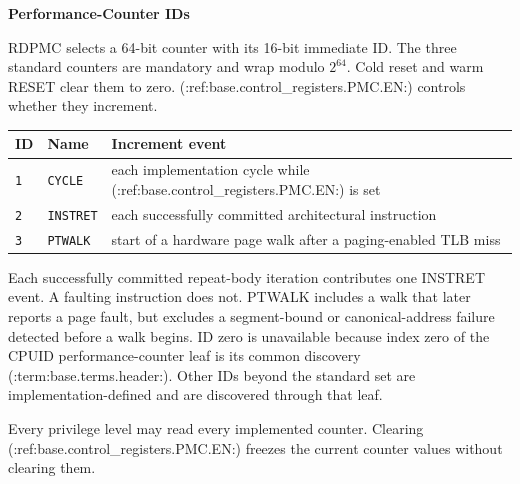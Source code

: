 \textbf{Performance-Counter IDs}\par
RDPMC selects a 64-bit counter with its 16-bit immediate ID. The three standard counters are mandatory and wrap
modulo $2^{64}$. Cold reset and warm RESET clear them to zero. (:ref:base.control_registers.PMC.EN:) controls whether they increment.

\Needspace{1.25in}
\begingroup\footnotesize
\setlength{\aboverulesep}{0pt}
\setlength{\belowrulesep}{0pt}
\setlength{\extrarowheight}{1.2pt}
\begin{center}
\begin{tabularx}{\linewidth}{@{}>{\raggedright\arraybackslash}p{0.55in}>{\raggedright\arraybackslash}p{1.05in}>{\raggedright\arraybackslash}X@{}}
\toprule
\rowcolor{BedrockHeaderFill}
\textbf{ID} & \textbf{Name} & \textbf{Increment event}\\
\midrule
\texttt{1} & \texttt{CYCLE} & each implementation cycle while (:ref:base.control_registers.PMC.EN:) is set\\
\texttt{2} & \texttt{INSTRET} & each successfully committed architectural instruction\\
\texttt{3} & \texttt{PTWALK} & start of a hardware page walk after a paging-enabled TLB miss\\
\bottomrule
\end{tabularx}
\end{center}
\endgroup

Each successfully committed repeat-body iteration contributes one INSTRET event. A faulting instruction does not.
PTWALK includes a walk that later reports a page fault, but excludes a segment-bound or canonical-address failure
detected before a walk begins. ID zero is unavailable because index zero of the CPUID performance-counter leaf is its
common discovery (:term:base.terms.header:). Other IDs beyond the standard set are implementation-defined and are discovered through that
leaf.

\begin{BedrockRaggedBlock}
Every privilege level may read every implemented counter. Clearing (:ref:base.control_registers.PMC.EN:) freezes the current counter values
without clearing them.
\end{BedrockRaggedBlock}
